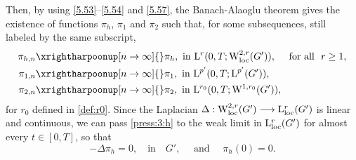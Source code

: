 \documentclass[12pt,reqno]{amsart}
\numberwithin{equation}{section}
\theoremstyle{definition}
\def\W{\mathrm{W}}
\def\loc{\mathrm{loc}}
\def\L{\mathrm{L}}
\begin{document}
{Then, by using \eqref{5.53}--\eqref{5.54} and \eqref{5.57}, the Banach-Alaoglu theorem gives the existence of functions $\pi_h$, $\pi_1$ and $\pi_2$ such that,
for some subsequences, still labeled by the same subscript,
\begin{alignat}{2}
	\label{5.58}
	\pi_{h,n} &\xrightharpoonup[n\to\infty]{}  \pi_h, \text{ in }\L^r(0,T;\W_\loc^{2,r}(G')),\quad \text{ for all }\  r\geq 1,\\
	\label{5.59}
	\pi_{1,n} &\xrightharpoonup[n\to\infty]{}\pi_1, \text{ in } \L^{p'}(0,T;\L^{p'}(G')),\\
	\label{5.60}
	\pi_{2,n}&\xrightharpoonup[n\to\infty]{}   \pi_2,   \text{ in } \L^{r_0}(0,T;\W^{1,r_0}(G')),
\end{alignat}
{for $r_0$ defined in \eqref{def:r0}.}
{Since the Laplacian $\Delta: \W^{2,r}_{\rm loc}(G') \longrightarrow \L^r_{\rm loc}(G')$ is linear and continuous,
we can pass \eqref{press:3:h} to the weak limit in $\L^r_{\rm loc}(G')$ for almost every $t \in [0,T]$, so that
\begin{equation}\label{press:3:h:wl}
-\Delta \pi_{h}=0,\quad \mbox{in}\quad G', \quad \text{ and } \quad \pi_{h}(0)=0.
\end{equation}}

}
\end{document}
